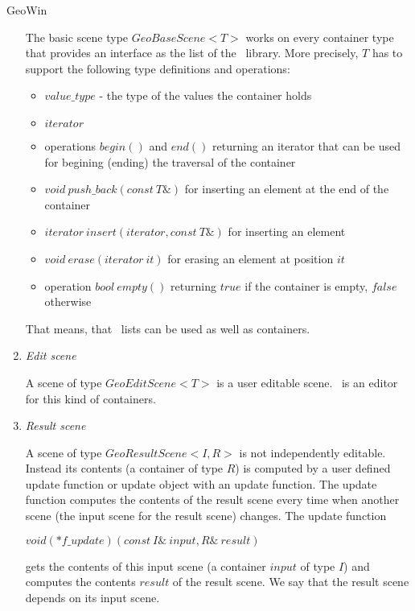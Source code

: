\begin{ccRefClass}{GeoWin}
\begin{enumerate}
    The basic scene  type $GeoBaseScene<T>$ works on  every 
    container type  that provides an interface as the list of the \stl\ library. 
    More precisely, $T$ has to support the following type definitions and operations:
    \begin{itemize}
    \item $value\_type$ - the type of the values the container holds
    \item $iterator$ 
    \item operations $begin()$ and $end()$ returning an iterator that can be used
          for begining (ending) the traversal of the container
    \item $void \ push\_back(const \ T\&)$ for inserting an element at the end of the container
    \item $iterator \ insert(iterator, const \ T\&)$ for inserting an element
    \item $void \ erase(iterator \ it)$ for erasing an element at position $it$
    \item operation $bool \ empty()$ returning $true$ if the container is empty, $false$
          otherwise    
    \end{itemize}
    
    That means, that \leda\ lists can be used as well as containers.

    \item {\em Edit scene}
    
    A scene of type $GeoEditScene<T>$ is a user editable scene.
    \ccRefName\ is an editor for this kind of containers.
    
    \item {\em Result scene}
    
    A scene of type $GeoResultScene<I,R>$ is not independently 
    editable. Instead its contents (a container of type $R$) is computed by a user
    defined update
    function or update object with an update function. The update function computes
    the contents of the result scene every time when another scene (the input scene for
    the result scene) changes. The update function
    
      $void (*f\_update)(const \ I\& \ input, R\& \ result)$
      
    gets the contents of this input scene (a container $input$ of type $I$) and computes
    the contents $result$ of the result scene.
    We say that the result scene depends on its input scene.
    
    \end{enumerate}


\end{ccRefClass}
